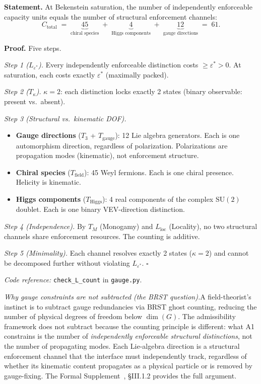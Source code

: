 \documentclass[11pt]{article}
\newenvironment{varlist}{\begin{itemize}[nosep,leftmargin=2em]}{\end{itemize}}
\newcommand{\coderef}[2]{\smallskip\noindent\textit{Code reference:} \texttt{#1} in \texttt{#2}.}
\newcommand{\SU}{\mathrm{SU}}
\begin{document}
\begin{tcolorbox}[apfbox, title={Lemma $L_{\mathrm{count}}$ (Capacity Counting)}]
\textbf{Statement.}  At Bekenstein saturation, the number of independently enforceable capacity units equals the number of structural enforcement channels:
\begin{equation}
C_{\mathrm{total}} \;=\; \underbrace{45}_{\text{chiral species}} \;+\; \underbrace{4}_{\text{Higgs components}} \;+\; \underbrace{12}_{\text{gauge directions}} \;=\; 61.
\label{eq:ctotal}
\end{equation}

\smallskip\noindent\textbf{Proof.}  Five steps.

\textit{Step 1 ($L_{\varepsilon^*}$).}  Every independently enforceable distinction costs $\ge \varepsilon^* > 0$.  At saturation, each costs exactly $\varepsilon^*$ (maximally packed).

\textit{Step 2 ($T_\kappa$).}  $\kappa = 2$: each distinction locks exactly 2 states (binary observable: present vs.\ absent).

\textit{Step 3 (Structural vs.\ kinematic DOF).}
\begin{varlist}
\item \textbf{Gauge directions} ($T_3$ + $T_{\mathrm{gauge}}$): 12 Lie algebra generators.  Each is one automorphism direction, regardless of polarization.  Polarizations are propagation modes (kinematic), not enforcement structure.
\item \textbf{Chiral species} ($T_{\mathrm{field}}$): 45 Weyl fermions.  Each is one chiral presence.  Helicity is kinematic.
\item \textbf{Higgs components} ($T_{\mathrm{Higgs}}$): 4 real components of the complex $\SU(2)$ doublet.  Each is one binary VEV-direction distinction.
\end{varlist}

\textit{Step 4 (Independence).}  By $T_M$ (Monogamy) and $L_{\mathrm{loc}}$ (Locality), no two structural channels share enforcement resources.  The counting is additive.

\textit{Step 5 (Minimality).}  Each channel resolves exactly 2 states ($\kappa = 2$) and cannot be decomposed further without violating $L_{\varepsilon^*}$.  $\square$

\coderef{check\_L\_count}{gauge.py}
\end{tcolorbox}

\smallskip\noindent\textit{Why gauge constraints are not subtracted (the BRST question).}\quad A field-theorist's instinct is to subtract gauge redundancies via BRST ghost counting, reducing the number of physical degrees of freedom below $\dim(G)$.  The admissibility framework does not subtract because the counting principle is different: what A1 constrains is the number of \emph{independently enforceable structural distinctions}, not the number of propagating modes.  Each Lie-algebra direction is a structural enforcement channel that the interface must independently track, regardless of whether its kinematic content propagates as a physical particle or is removed by gauge-fixing.  The Formal Supplement~\cite{BrookeP2Supplement}, \S III.1.2 provides the full argument.
\end{document}
